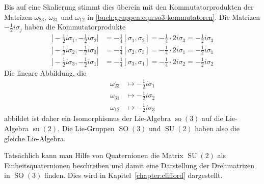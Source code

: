 Bis auf eine Skalierung stimmt dies überein mit den Kommutatorprodukten
der Matrizen $\omega_{23}$, $\omega_{31}$ und $\omega_{12}$
in \eqref{buch:gruppen:eqn:so3-kommutatoren}.
Die Matrizen $-\frac12i\sigma_j$ haben die Kommutatorprodukte
\begin{align*}
\bigl[-{\textstyle\frac12}i\sigma_1,-{\textstyle\frac12}i\sigma_2\bigr]
&=
-{\textstyle\frac14}[\sigma_1,\sigma_2]
=
-{\textstyle\frac14}\cdot 2i\sigma_3
=
-{\textstyle\frac12}i\sigma_3
\\
\bigl[-{\textstyle\frac12}i\sigma_2,-{\textstyle\frac12}i\sigma_3\bigr]
&=
-{\textstyle\frac14}[\sigma_2,\sigma_3]
=
-{\textstyle\frac14}\cdot 2i\sigma_1
=
-{\textstyle\frac12}i\sigma_1
\\
\bigl[-{\textstyle\frac12}i\sigma_3,-{\textstyle\frac12}i\sigma_1\bigr]
&=
-{\textstyle\frac14}[\sigma_3,\sigma_1]
=
-{\textstyle\frac14}\cdot 2i\sigma_2
=
-{\textstyle\frac12}i\sigma_2
\end{align*}
Die lineare Abbildung, die
\begin{align*}
\omega_{23}&\mapsto -{\textstyle\frac12}i\sigma_1\\
\omega_{31}&\mapsto -{\textstyle\frac12}i\sigma_2\\
\omega_{12}&\mapsto -{\textstyle\frac12}i\sigma_3
\end{align*}
abbildet ist daher ein Isomorphismus der Lie-Algebra $\operatorname{so}(3)$
auf die Lie-Algebra $\operatorname{su}(2)$.
Die Lie-Gruppen $\operatorname{SO}(3)$ und $\operatorname{SU}(2)$
haben also die gleiche Lie-Algebra.

Tatsächlich kann man Hilfe von Quaternionen die Matrix $\operatorname{SU}(2)$
als Einheitsquaternionen beschreiben und damit eine Darstellung der
Drehmatrizen in $\operatorname{SO}(3)$ finden.
Dies wird in Kapitel~\ref{chapter:clifford} dargestellt.





